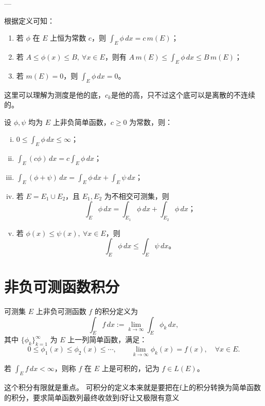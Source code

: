 \documentclass[lang=cn,10pt]{elegantbook}
\begin{document}
---

\begin{remark}
根据定义可知：
\begin{enumerate}
  \item 若 $\phi$ 在 $E$ 上恒为常数 $c$，则 $\displaystyle \int_E \phi\, dx = c\, m(E)$；
  \item 若 $A \leq \phi(x) \leq B,\ \forall x \in E$，则有 $A\, m(E) \leq \displaystyle \int_E \phi\, dx \leq B\, m(E)$；
  \item 若 $m(E) = 0$，则 $\displaystyle \int_E \phi\, dx = 0$。
\end{enumerate}
\end{remark}
这里可以理解为测度是他的底，$c_k$是他的高，只不过这个底可以是离散的不连续的。
\begin{theorem}
设 $\phi,\psi$ 均为 $E$ 上非负简单函数，$c \geq 0$ 为常数，则：

\begin{enumerate}[(i)]
  \item $0 \leq \displaystyle \int_E \phi\,dx \leq \infty$；
  \item $\displaystyle \int_E (c\phi)\,dx = c \int_E \phi\,dx$；
  \item $\displaystyle \int_E (\phi + \psi)\,dx = \int_E \phi\,dx + \int_E \psi\,dx$；
  \item 若 $E = E_1 \cup E_2$，且 $E_1, E_2$ 为不相交可测集，则
  \[
  \int_E \phi\,dx = \int_{E_1} \phi\,dx + \int_{E_2} \phi\,dx；
  \]
  \item 若 $\phi(x) \leq \psi(x),\ \forall x \in E$，则
  \[
  \int_E \phi\,dx \leq \int_E \psi\,dx。
  \]
\end{enumerate}
\end{theorem}
\section{非负可测函数积分}
\begin{definition}[非负可测函数的积分]\label{def:nonnegative_integral}
可测集 $E$ 上非负可测函数 $f$ 的积分定义为
\[
\int_E f\,dx := \lim_{k \to \infty} \int_E \phi_k\,dx,
\]
其中 $\{\phi_k\}_{k=1}^\infty$ 为 $E$ 上一列简单函数，满足：
\begin{equation}
0 \leq \phi_1(x) \leq \phi_2(x) \leq \cdots, \qquad \lim_{k \to \infty} \phi_k(x) = f(x), \quad \forall x \in E.
\label{eq:approx_simple}
\end{equation}

若 $\int_E f\,dx < \infty$，则称 $f$ 在 $E$ 上是可积的，记为 $f \in L(E)$。
\end{definition}
这个积分有限就是重点。
可积分的定义本来就是要把在f上的积分转换为简单函数的积分，要求简单函数列最终收敛到f好让又极限有意义
\end{document}
